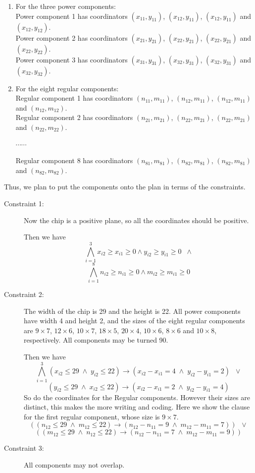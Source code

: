 \documentclass[11pt]{article}
\begin{document}
{\begin{enumerate}
  \item For the three power components:\\
  Power component 1 has coordinators $(x_{11}, y_{11})$, $(x_{12}, y_{11})$, $(x_{12}, y_{11})$ and $(x_{12}, y_{12})$.\\
  Power component 2 has coordinators $(x_{21}, y_{21})$, $(x_{22}, y_{21})$, $(x_{22}, y_{21})$ and $(x_{22}, y_{22})$.\\
  Power component 3 has coordinators $(x_{31}, y_{31})$, $(x_{32}, y_{31})$, $(x_{32}, y_{31})$ and $(x_{32}, y_{32})$.
  \item For the eight regular components:\\
  Regular component 1 has coordinators $(n_{11}, m_{11})$, $(n_{12}, m_{11})$, $(n_{12}, m_{11})$ and $(n_{12}, m_{12})$.\\
  Regular component 2 has coordinators $(n_{21}, m_{21})$, $(n_{22}, m_{21})$, $(n_{22}, m_{21})$ and $(n_{22}, m_{22})$.

  $\cdots \cdots$

  Regular component 8 has coordinators $(n_{81}, m_{81})$, $(n_{82}, m_{81})$, $(n_{82}, m_{81})$ and $(n_{82}, m_{82})$.
\end{enumerate}
Thus, we plan to put the components onto the plan in terms of the constraints.

\begin{description}
  \item[Constraint 1:] Now the chip is a positive plane, so all the coordinates should be positive.

  Then we have
  \[  \bigwedge_{i=1}^3 x_{i2} \geq x_{i1} \geq 0 \wedge y_{i2} \geq y_{i1} \geq 0 \;\; \wedge \]
  \[  \bigwedge_{i=1}^8 n_{i2} \geq n_{i1} \geq 0 \wedge m_{i2} \geq m_{i1} \geq 0 \]
  \item[Constraint 2:] The width of the chip is 29 and the height is 22. All power components have width 4 and height 2,
  and the sizes of the eight regular components are $9 \times 7$, $12 \times 6$, $10 \times 7$, $18 \times 5$, $20 \times 4$, $10 \times 6$, $8 \times 6$ and $10 \times 8$, respectively.
  All components may be turned 90.

  Then we have
  \[  \bigwedge_{i=1}^3 (x_{i2} \leq 29 \; \wedge \; y_{i2} \leq 22) \rightarrow (x_{i2} - x_{i1} = 4 \; \wedge \; y_{i2} - y_{i1} = 2) \;\; \vee \]
  \[ (y_{i2} \leq 29 \; \wedge \; x_{i2} \leq 22) \rightarrow (x_{i2} - x_{i1} = 2 \; \wedge \; y_{i2} - y_{i1} = 4) \]
  So do the coordinates for the Regular components. However their sizes are distinct,
  this makes the more writing and coding. Here we show the clause for the first regular component,
  whose size is $9 \times 7$. \\
  \[ ((n_{12} \leq 29 \; \wedge \; m_{12} \leq 22) \rightarrow (n_{12} - n_{11} = 9 \; \wedge \; m_{12} - m_{11} = 7)) \;\; \vee \]
  \[ ((m_{12} \leq 29 \; \wedge \; n_{12} \leq 22) \rightarrow (n_{12} - n_{11} = 7 \; \wedge \; m_{12} - m_{11} = 9)) \]
  \item[Constraint 3:] All components may not overlap.


\end{description}}
\end{document}
